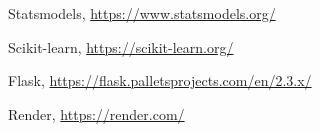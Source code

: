 \documentclass{article}
\begin{document}
\begin{thebibliography}{999}

    Statsmodels, 
    \url{https://www.statsmodels.org/}
  
    Scikit-learn,
    \url{https://scikit-learn.org/}

    Flask,
    \url{https://flask.palletsprojects.com/en/2.3.x/}

    Render,
    \url{https://render.com/}
    
\end{thebibliography}
\end{document}

